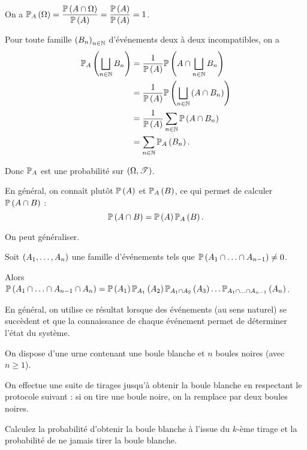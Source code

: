 \begin{dem}~\\
On a \(\probacond{\Omega}{A}=\dfrac{\proba{A\inter\Omega}}{\proba{A}}=\dfrac{\proba{A}}{\proba{A}}=1\).

Pour toute famille \(\paren{B_n}_{n\in\N}\) d'événements deux à deux incompatibles, on a \[\begin{aligned}
\probacond{\bigsqcup_{n\in\N}B_n}{A}&=\dfrac{1}{\proba{A}}\proba{A\inter\bigsqcup_{n\in\N}B_n} \\
&=\dfrac{1}{\proba{A}}\proba{\bigsqcup_{n\in\N}\paren{A\inter B_n}} \\
&=\dfrac{1}{\proba{A}}\sum_{n\in\N}\proba{A\inter B_n} \\
&=\sum_{n\in\N}\probacond{B_n}{A}.
\end{aligned}\]

Donc \(\prem_A\) est une probabilité sur \(\groupe{\Omega}[\fami{T}]\).
\end{dem}

En général, on connaît plutôt \(\proba{A}\) et \(\probacond{B}{A}\), ce qui permet de calculer \(\proba{A\inter B}\) : \[\proba{A\inter B}=\proba{A}\probacond{B}{A}.\]

On peut généraliser.

\begin{theo}
Soit \(\paren{A_1,\dots,A_n}\) une famille d'événements tels que \(\proba{A_1\inter\dots\inter A_{n-1}}\not=0\).

Alors \(\proba{A_1\inter\dots\inter A_{n-1}\inter A_n}=\proba{A_1}\probacond{A_2}{A_1}\probacond{A_3}{A_1\inter A_2}\dots\probacond{A_n}{A_1\inter\dots\inter A_{n-1}}\).
\end{theo}

En général, on utilise ce résultat lorsque des événements (au sens naturel) se succèdent et que la connaissance de chaque événement permet de déterminer l'état du système.

\begin{exo}
On dispose d'une urne contenant une boule blanche et \(n\) boules noires (avec \(n\geq1\)).

On effectue une suite de tirages jusqu'à obtenir la boule blanche en respectant le protocole suivant : si on tire une boule noire, on la remplace par deux boules noires.

Calculez la probabilité d'obtenir la boule blanche à l'issue du \(k\)-ème tirage et la probabilité de ne jamais tirer la boule blanche.
\end{exo}

